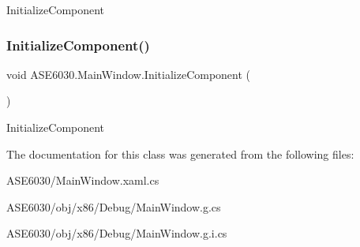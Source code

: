 Initialize\+Component 

\mbox{\label{class_a_s_e6030_1_1_main_window_ae87e50858240332fce20264ac23638e8}} 
\subsubsection{\texorpdfstring{Initialize\+Component()}{InitializeComponent()}\hspace{0.1cm}{\footnotesize\ttfamily [3/3]}}
{\footnotesize\ttfamily void A\+S\+E6030.\+Main\+Window.\+Initialize\+Component (\begin{DoxyParamCaption}{ }\end{DoxyParamCaption})\hspace{0.3cm}{\ttfamily [inline]}}



Initialize\+Component 



The documentation for this class was generated from the following files\+:\begin{DoxyCompactItemize}
\item 
A\+S\+E6030/Main\+Window.\+xaml.\+cs\item 
A\+S\+E6030/obj/x86/\+Debug/Main\+Window.\+g.\+cs\item 
A\+S\+E6030/obj/x86/\+Debug/Main\+Window.\+g.\+i.\+cs\end{DoxyCompactItemize}
